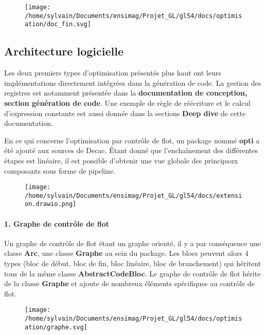 \documentclass[
]{article}
\begin{document}
\begin{figure}
\centering
\texttt{[image: /home/sylvain/Documents/ensimag/Projet\_GL/gl54/docs/optimisation/doc\_fin.svg]}
\caption{}
\end{figure}

\hypertarget{architecture-logicielle}{%
\subsection{Architecture logicielle}\label{architecture-logicielle}}

Les deux premiers types d'optimisation présentés plus haut ont leurs
implémentations directement intégrées dans la génération de code. La
gestion des registres est notamment présentée dans la
\textbf{documentation de conception, section génération de code}. Une
exemple de règle de réécriture et le calcul d'expression constante est
aussi donnée dans la sections \textbf{Deep dive} de cette documentation.

En ce qui concerne l'optimisation par contrôle de flot, un package nommé
\textbf{opti} a été ajouté aux sources de Decac. Étant donné que
l'enchaînement des différentes étapes est linéaire, il est possible
d'obtenir une vue globale des principaux composants sous forme de
pipeline.

\begin{figure}
\centering
\texttt{[image: /home/sylvain/Documents/ensimag/Projet\_GL/gl54/docs/extension.drawio.png]}
\caption{}
\end{figure}

\hypertarget{1-graphe-de-contruxf4le-de-flot}{%
\paragraph{1. Graphe de contrôle de
flot}\label{1-graphe-de-contruxf4le-de-flot}}

Un graphe de contrôle de flot étant un graphe orienté, il y a par
conséquence une classe \textbf{Arc}, une classe \textbf{Graphe} au sein
du package. Les blocs peuvent alors 4 types (bloc de début, bloc de fin,
bloc linéaire, bloc de branchement) qui héritent tous de la même classe
\textbf{AbstractCodeBloc}. Le graphe de contrôle de flot hérite de la
classe \textbf{Graphe} et ajoute de nombreux éléments spécifiques au
contrôle de flot.

\begin{figure}
\centering
\texttt{[image: /home/sylvain/Documents/ensimag/Projet\_GL/gl54/docs/optimisation/graphe.svg]}
\caption{}
\end{figure}
\end{document}
